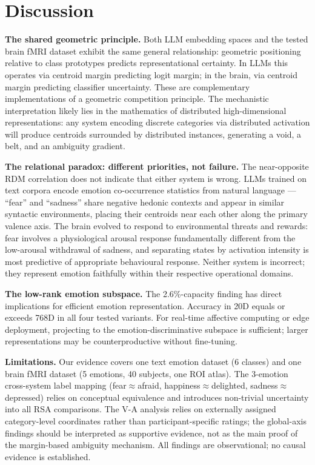 \documentclass{article}
\begin{document}
\section{Discussion}

\textbf{The shared geometric principle.}
Both LLM embedding spaces and the tested brain fMRI dataset exhibit the same general
relationship: geometric positioning relative to class prototypes predicts
representational certainty.
In LLMs this operates via centroid margin predicting logit margin; in the brain,
via centroid margin predicting classifier uncertainty.
These are complementary implementations of a geometric competition principle.
The mechanistic interpretation likely lies in the mathematics of distributed
high-dimensional representations: any system encoding discrete categories via
distributed activation will produce centroids surrounded by distributed instances,
generating a void, a belt, and an ambiguity gradient.

\textbf{The relational paradox: different priorities, not failure.}
The near-opposite RDM correlation does not indicate that either system is wrong.
LLMs trained on text corpora encode emotion co-occurrence statistics from natural
language --- ``fear'' and ``sadness'' share negative hedonic contexts and appear in
similar syntactic environments, placing their centroids near each other along the
primary valence axis.
The brain evolved to respond to environmental threats and rewards: fear involves
a physiological arousal response fundamentally different from the low-arousal
withdrawal of sadness, and separating states by activation intensity is most predictive
of appropriate behavioural response.
Neither system is incorrect; they represent emotion faithfully within their
respective operational domains.

\textbf{The low-rank emotion subspace.}
The 2.6\%-capacity finding has direct implications for efficient emotion representation.
Accuracy in 20D equals or exceeds 768D in all four tested variants.
For real-time affective computing or edge deployment, projecting to the
emotion-discriminative subspace is sufficient; larger representations may be
counterproductive without fine-tuning.

\textbf{Limitations.}
Our evidence covers one text emotion dataset (6 classes) and one brain fMRI dataset
(5 emotions, 40 subjects, one ROI atlas).
The 3-emotion cross-system label mapping (fear$\approx$afraid, happiness$\approx$delighted,
sadness$\approx$depressed) relies on conceptual equivalence and introduces non-trivial
uncertainty into all RSA comparisons.
The V-A analysis relies on externally assigned category-level coordinates rather than
participant-specific ratings; the global-axis findings should be interpreted as
supportive evidence, not as the main proof of the margin-based ambiguity mechanism.
All findings are observational; no causal evidence is established.
\end{document}
